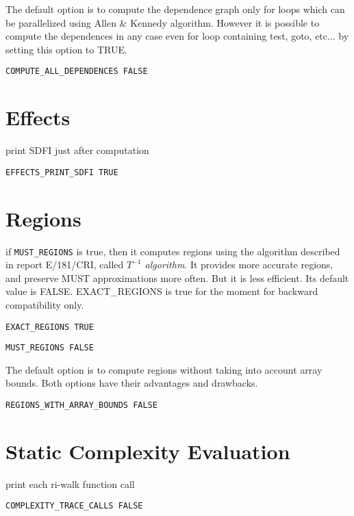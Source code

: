The default option is to compute the dependence graph only for loops
which can be parallelized using Allen \& Kennedy algorithm.
However it is possible to
compute the dependences in any case even for loop containing test, goto,
etc...
by setting this option to TRUE.

\begin{verbatim}
COMPUTE_ALL_DEPENDENCES FALSE
\end{verbatim}

\section{Effects}

print SDFI just after computation

\begin{verbatim}
EFFECTS_PRINT_SDFI TRUE
\end{verbatim}

\section{Regions}

if {\tt MUST_REGIONS} is true, then it computes regions using the algorithm
described in report E/181/CRI, called {\em $T^{-1}$ algorithm}. It provides more
accurate regions, and preserve MUST approximations more often. But it is less
efficient. Its default value is FALSE. EXACT_REGIONS is true for the moment for
backward compatibility only.

\begin{verbatim}
EXACT_REGIONS TRUE
\end{verbatim}

\begin{verbatim}
MUST_REGIONS FALSE
\end{verbatim}

The default option is to compute regions without taking into account array
bounds. Both options have their advantages and drawbacks. 

\begin{verbatim}
REGIONS_WITH_ARRAY_BOUNDS FALSE
\end{verbatim}


\section{Static Complexity Evaluation}

print each ri-walk function call

\begin{verbatim}
COMPLEXITY_TRACE_CALLS FALSE
\end{verbatim}


